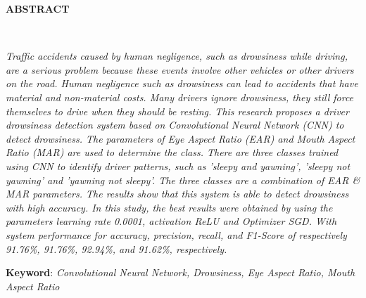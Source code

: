 \clearpage

\begin{minipage}{\textwidth}

\centering
\end{minipage}

\vspace{1em}

\normalsize \bfseries \centering \MakeUppercase{Abstract}
% 
\\[2\baselineskip]

\justifying \normalfont \normalsize

{

\textit{Traffic accidents caused by human negligence, such as drowsiness while driving, are a serious problem because these events involve other vehicles or other drivers on the road. Human negligence such as drowsiness can lead to accidents that have material and non-material costs. Many drivers ignore drowsiness, they still force themselves to drive when they should be resting. This research proposes a driver drowsiness detection system based on Convolutional Neural Network (CNN) to detect drowsiness. The parameters of Eye Aspect Ratio (EAR) and Mouth Aspect Ratio (MAR) are used to determine the class. There are three classes trained using CNN to identify driver patterns, such as 'sleepy and yawning', 'sleepy not yawning' and 'yawning not sleepy'. The three classes 
are a combination of EAR \& MAR parameters. The results show that this system is able to detect drowsiness with high accuracy. In this study, the best results were obtained by using the parameters \textit{learning rate} 0.0001, \textit{activation} ReLU and \textit{Optimizer} SGD. With system performance for accuracy, precision, recall, and F1-Score of respectively 91.76\%, 91.76\%, 92.94\%, and 91.62\%, respectively.
}

}

\textbf{Keyword}: \textit{Convolutional Neural Network, Drowsiness, Eye Aspect Ratio, Mouth
Aspect Ratio}

\clearpage